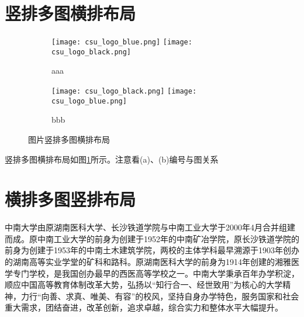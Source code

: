 \section{竖排多图横排布局}

\begin{figure}[!htb]
    \centering
    \begin{subfigure}[t]{0.13\linewidth}
        \captionsetup{justification=centering} 
        \begin{minipage}[b]{1\linewidth}
        \texttt{[image: csu\_logo\_blue.png]} 
        \vspace{-1ex} \vfill
        \texttt{[image: csu\_logo\_black.png]}
        \caption{aaa}
        \end{minipage}
    \end{subfigure}
    \begin{subfigure}[t]{0.13\linewidth}
        \captionsetup{justification=centering} 
        \begin{minipage}[b]{1\linewidth}
        \texttt{[image: csu\_logo\_black.png]} 
        \vspace{-1ex} \vfill
        \texttt{[image: csu\_logo\_blue.png]}
        \caption{bbb}
        \end{minipage}
    \end{subfigure}
    \caption{图片竖排多图横排布局}
    \label{f.csu_col_row}
\end{figure}

竖排多图横排布局如图\ref{f.csu_col_row}所示。注意看(a)、(b)编号与图关系


\section{横排多图竖排布局}

中南大学由原湖南医科大学、长沙铁道学院与中南工业大学于2000年4月合并组建而成。原中南工业大学的前身为创建于1952年的中南矿冶学院，原长沙铁道学院的前身为创建于1953年的中南土木建筑学院，两校的主体学科最早溯源于1903年创办的湖南高等实业学堂的矿科和路科。原湖南医科大学的前身为1914年创建的湘雅医学专门学校，是我国创办最早的西医高等学校之一。中南大学秉承百年办学积淀，顺应中国高等教育体制改革大势，弘扬以“知行合一、经世致用”为核心的大学精神，力行“向善、求真、唯美、有容”的校风，坚持自身办学特色，服务国家和社会重大需求，团结奋进，改革创新，追求卓越，综合实力和整体水平大幅提升。

